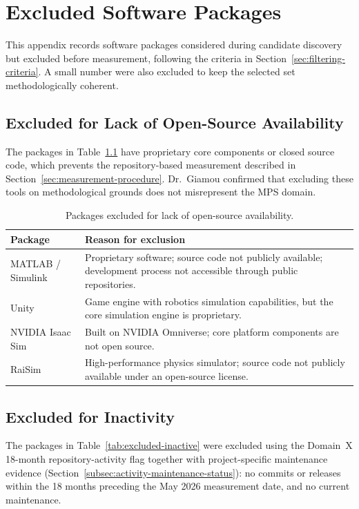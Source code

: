 \chapter{Excluded Software Packages}
\label{appendix:excluded-software-packages}

This appendix records software packages considered during candidate discovery but excluded before measurement, following the criteria in Section~\ref{sec:filtering-criteria}. A small number were also excluded to keep the selected set methodologically coherent.

\section*{Excluded for Lack of Open-Source Availability}

The packages in Table~\ref{tab:excluded-non-oss} have proprietary core components or closed source code, which prevents the repository-based measurement described in Section~\ref{sec:measurement-procedure}. Dr.~Giamou confirmed that excluding these tools on methodological grounds does not misrepresent the MPS domain.

\begin{table}[H]
\centering
\caption{Packages excluded for lack of open-source availability.}
\label{tab:excluded-non-oss}
\small
\begin{tabular}{@{}p{3.5cm}p{9.5cm}@{}}
\toprule
\textbf{Package} & \textbf{Reason for exclusion} \\
\midrule
MATLAB / Simulink & Proprietary software; source code not publicly available; development process not accessible through public repositories. \\
Unity & Game engine with robotics simulation capabilities, but the core simulation engine is proprietary. \\
NVIDIA Isaac Sim & Built on NVIDIA Omniverse; core platform components are not open source. \\
RaiSim & High-performance physics simulator; source code not publicly available under an open-source license. \\
\bottomrule
\end{tabular}
\end{table}

\section*{Excluded for Inactivity}

The packages in Table~\ref{tab:excluded-inactive} were excluded using the Domain~X 18-month repository-activity flag together with project-specific maintenance evidence (Section~\ref{subsec:activity-maintenance-status}): no commits or releases within the 18 months preceding the May 2026 measurement date, and no current maintenance.

